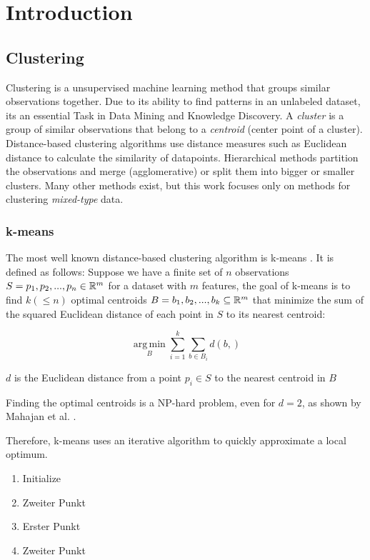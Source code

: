 \chapter{Introduction}


\section{Clustering}

Clustering is a unsupervised machine learning method that groups similar observations together. Due to its ability to find patterns in an unlabeled dataset, its an essential Task in Data Mining and Knowledge Discovery. A \textit{cluster} is a group of similar observations that belong to a \textit{centroid} (center point of a cluster). Distance-based clustering algorithms use distance measures such as Euclidean distance to calculate the similarity of datapoints. Hierarchical methods partition the observations and merge (agglomerative) or split them into bigger or smaller clusters. Many other methods exist, but this work focuses only on methods for clustering \textit{mixed-type} data. \cite{mixed_type_survey_2019}

\subsection{k-means}

The most well known distance-based clustering algorithm is k-means \cite{kmeans}. It is defined as follows: Suppose we have a finite set of $n$ observations $S={p_1, p_2, ..., p_n} \in \mathbb{R}^m$ for a dataset with $m$ features, the goal of k-means is to find $k (\leq n)$ optimal centroids $B={b_1, b_2, ..., b_k} \subseteq \mathbb{R}^m$ that minimize the sum of the squared Euclidean distance of each point in $S$ to its nearest centroid: 

$$\operatorname*{arg\,min}_B \sum_{i=1}^k \sum_{b \in B_i} d(b, )$$

$d$ is the Euclidean distance from a point $p_i \in S$ to the nearest centroid in $B$


Finding the optimal centroids is a NP-hard problem, even for $d=2$, as shown by Mahajan et al. \cite{kmeans_np_hard}. 


Therefore, k-means uses an iterative algorithm to quickly approximate a local optimum. 

\begin{enumerate} 
	\item Initialize 
	\item Zweiter Punkt
	\item Erster Punkt
	\item Zweiter Punkt
\end{enumerate}